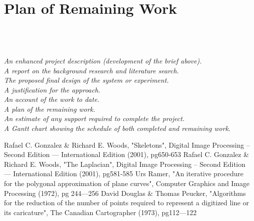 \documentclass[a4paper, 12pt]{article}
\begin{document}
\section{Plan of Remaining Work}
%
\emph{\\\\\\An enhanced project description (development of the brief above).\\
A report on the background research and literature search.\\
The proposed final design of the system or experiment.\\
A justification for the approach.\\
An account of the work to date.\\
A plan of the remaining work.\\
An estimate of any support required to complete the project.\\
A Gantt chart showing the schedule of both completed and remaining work}.\\
%
%
%
%
%
%
%
\begin{thebibliography}{9}
    Rafael C. Gonzalez \& Richard E. Woods,
    "Skeletons",
    Digital Image Processing -- Second Edition --- International Edition (2001),
    pg650-653
%
    Rafael C. Gonzalez \& Richard E. Woods,
    "The Laplacian",
    Digital Image Processing -- Second Edition --- International Edition (2001),
    pg581-585
%
    Urs Ramer,
    "An iterative procedure for the polygonal approximation of plane curves",
    Computer Graphics and Image Processing (1972),
    pg 244--–256
%
	David Douglas \& Thomas Peucker,
	"Algorithms for the reduction of the number of points required to represent a 				digitized line or its caricature",
	The Canadian Cartographer (1973),
	pg112--–122
\end{thebibliography}
%
\end{document}

